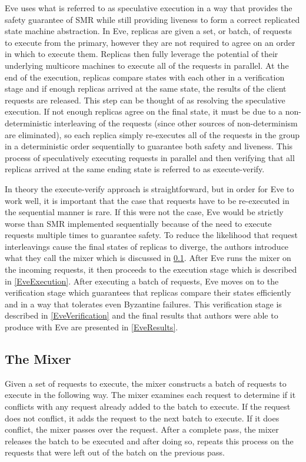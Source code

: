 \documentclass[11pt, oneside]{report}
\begin{document}
Eve uses what is referred to as speculative execution in a way that provides the safety guarantee of SMR while still providing liveness to form a correct replicated state machine abstraction. In Eve, replicas are given a set, or batch, of requests to execute from the primary, however they are not required to agree on an order in which to execute them. Replicas then fully leverage the potential of their underlying multicore machines to execute all of the requests in parallel. At the end of the execution, replicas compare states with each other in a verification stage and if enough replicas arrived at the same state, the results of the client requests are released. This step can be thought of as resolving the speculative execution. If not enough replicas agree on the final state, it must be due to a non-deterministic interleaving of the requests (since other sources of non-determinism are eliminated), so each replica simply re-executes all of the requests in the group in a deterministic order sequentially to guarantee both safety and liveness. This process of speculatively executing requests in parallel and then verifying that all replicas arrived at the same ending state is referred to as execute-verify.

In theory the execute-verify approach is straightforward, but in order for Eve to work well, it is important that the case that requests have to be re-executed in the sequential manner is rare. If this were not the case, Eve would be strictly worse than SMR implemented sequentially because of the need to execute requests multiple times to guarantee safety. To reduce the likelihood that request interleavings cause the final states of replicas to diverge, the authors introduce what they call the mixer which is discussed in \ref{EveMixer}. After Eve runs the mixer on the incoming requests, it then proceeds to the execution stage which is described in \ref{EveExecution}. After executing a batch of requests, Eve moves on to the verification stage which guarantees that replicas compare their states efficiently and in a way that tolerates even Byzantine failures. This verification stage is described in \ref{EveVerification} and the final results that authors were able to produce with Eve are presented in \ref{EveResults}.

\subsection{The Mixer}\label{EveMixer}
Given a set of requests to execute, the mixer constructs a batch of requests to execute in the following way. The mixer examines each request to determine if it conflicts with any request already added to the batch to execute. If the request does not conflict, it adds the request to the next batch to execute. If it does conflict, the mixer passes over the request. After a complete pass, the mixer releases the batch to be executed and after doing so, repeats this process on the requests that were left out of the batch on the previous pass.
\end{document}
